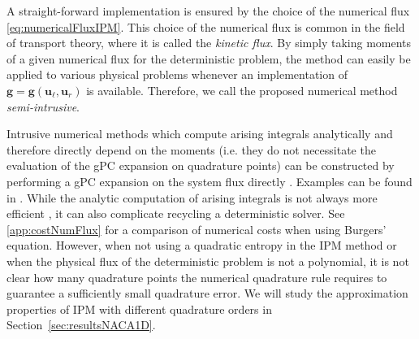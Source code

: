 A straight-forward implementation is ensured by the choice of the numerical flux \eqref{eq:numericalFluxIPM}. This choice of the numerical flux is common in the field of transport theory, where it is called the \textit{kinetic flux}. By simply taking moments of a given numerical flux for the deterministic problem, the method can easily be applied to various physical problems whenever an implementation of $\bm g = \bm g(\bm u_\ell, \bm u_r)$ is available. Therefore, we call the proposed numerical method \textit{semi-intrusive}.

Intrusive numerical methods which compute arising integrals analytically and therefore directly depend on the moments (i.e. they do not necessitate the evaluation of the gPC expansion on quadrature points) can be constructed by performing a gPC expansion on the system flux directly \cite{debusschere2004numerical}. Examples can be found in \cite{hu2015stochastic,hu2016stochastic,tryoen2010instrusive}. While the analytic computation of arising integrals is not always more efficient \cite[Section 6]{ghanem1998stochastic}, it can also complicate recycling a deterministic solver. See \ref{app:costNumFlux} for a comparison of numerical costs when using Burgers' equation. However, when not using a quadratic entropy in the IPM method or when the physical flux of the deterministic problem is not a polynomial, it is not clear how many quadrature points the numerical quadrature rule requires to guarantee a sufficiently small quadrature error. We will study the approximation properties of IPM with different quadrature orders in Section~\ref{sec:resultsNACA1D}.